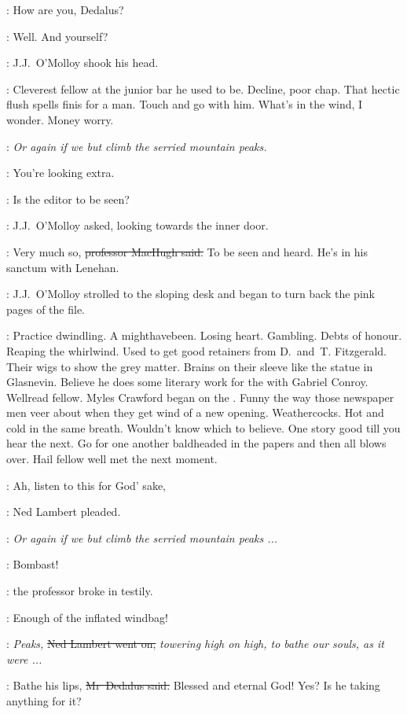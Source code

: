 \jjom:
How are you, Dedalus?

\simon:
Well. And yourself?

:
J.J.~O'Molloy shook his head.



\BloomInt:
Cleverest fellow at the junior bar he used to be.
Decline, poor chap.
That hectic flush spells finis for a man.
Touch and go with him.
What's in the wind, I wonder.
Money worry.

\lambert:
\emph{Or again if we but climb the serried mountain peaks.}

\simon:
You're looking extra.

\jjom:
Is the editor to be seen?

:
J.J.~O'Molloy asked,
looking towards the inner door.

\machugh:
Very much so,
\sout{professor MacHugh said.}
To be seen and heard.
He's in his sanctum with Lenehan.

:
J.J.~O'Molloy strolled to the sloping desk
and began to turn back the pink pages of the file.

\BloomInt:
Practice dwindling.
A mighthavebeen.
Losing heart.
Gambling.
Debts of honour.
Reaping the whirlwind.
Used to get good retainers from D.~and~T. Fitzgerald.
Their wigs to show the grey matter.
Brains on their sleeve like the statue in Glasnevin.
Believe he does some literary work for the  with Gabriel Conroy.
Wellread fellow.
Myles Crawford began on the .
Funny the way those newspaper men veer about when they get wind of a new opening.
Weathercocks.
Hot and cold in the same breath.
Wouldn't know which to believe.
One story good till you hear the next.
Go for one another baldheaded in the papers and then all blows over.
Hail fellow well met the next moment.

\lambert:
Ah, listen to this for God' sake,

:
Ned Lambert pleaded.

\lambert:
\emph{Or again if we but climb the serried mountain peaks ...}

\machugh:
Bombast!

:
the professor broke in testily.

\machugh:
Enough of the inflated windbag!

\lambert:
\emph{Peaks,}
\sout{Ned Lambert went on,}
\emph{towering high on high,
to bathe our souls,
as it were ...}

\simon:
Bathe his lips,
\sout{Mr~Dedalus said.}
Blessed and eternal God!
Yes?
Is he taking anything for it?

